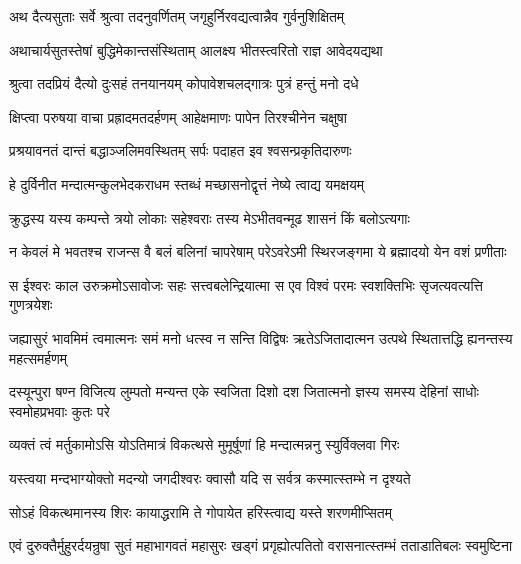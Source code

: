 


\twolineshloka
{अथ दैत्यसुताः सर्वे श्रुत्वा तदनुवर्णितम्}
{जगृहुर्निरवद्यत्वान्नैव गुर्वनुशिक्षितम्} %

\twolineshloka
{अथाचार्यसुतस्तेषां बुद्धिमेकान्तसंस्थिताम्}
{आलक्ष्य भीतस्त्वरितो राज्ञ आवेदयद्यथा} %

\twolineshloka
{श्रुत्वा तदप्रियं दैत्यो दुःसहं तनयानयम्}
{कोपावेशचलद्गात्रः पुत्रं हन्तुं मनो दधे} %

\twolineshloka
{क्षिप्त्वा परुषया वाचा प्रह्रादमतदर्हणम्}
{आहेक्षमाणः पापेन तिरश्चीनेन चक्षुषा} %

\twolineshloka
{प्रश्रयावनतं दान्तं बद्धाञ्जलिमवस्थितम्}
{सर्पः पदाहत इव श्वसन्प्रकृतिदारुणः} %



\twolineshloka
{हे दुर्विनीत मन्दात्मन्कुलभेदकराधम}
{स्तब्धं मच्छासनोद्वृत्तं नेष्ये त्वाद्य यमक्षयम्} %

\twolineshloka
{क्रुद्धस्य यस्य कम्पन्ते त्रयो लोकाः सहेश्वराः}
{तस्य मेऽभीतवन्मूढ शासनं किं बलोऽत्यगाः} %



\twolineshloka
{न केवलं मे भवतश्च राजन्स वै बलं बलिनां चापरेषाम्}
{परेऽवरेऽमी स्थिरजङ्गमा ये ब्रह्मादयो येन वशं प्रणीताः} %

\twolineshloka
{स ईश्वरः काल उरुक्रमोऽसावोजः सहः सत्त्वबलेन्द्रियात्मा}
{स एव विश्वं परमः स्वशक्तिभिः सृजत्यवत्यत्ति गुणत्रयेशः} %

\twolineshloka
{जह्यासुरं भावमिमं त्वमात्मनः समं मनो धत्स्व न सन्ति विद्विषः}
{ऋतेऽजितादात्मन उत्पथे स्थितात्तद्धि ह्यनन्तस्य महत्समर्हणम्} %

\twolineshloka
{दस्यून्पुरा षण्न विजित्य लुम्पतो मन्यन्त एके स्वजिता दिशो दश}
{जितात्मनो ज्ञस्य समस्य देहिनां साधोः स्वमोहप्रभवाः कुतः परे} %



\twolineshloka
{व्यक्तं त्वं मर्तुकामोऽसि योऽतिमात्रं विकत्थसे}
{मुमूर्षूणां हि मन्दात्मन्ननु स्युर्विक्लवा गिरः} %

\twolineshloka
{यस्त्वया मन्दभाग्योक्तो मदन्यो जगदीश्वरः}
{क्वासौ यदि स सर्वत्र कस्मात्स्तम्भे न दृश्यते} %

\twolineshloka
{सोऽहं विकत्थमानस्य शिरः कायाद्धरामि ते}
{गोपायेत हरिस्त्वाद्य यस्ते शरणमीप्सितम्} %

\twolineshloka
{एवं दुरुक्तैर्मुहुरर्दयन्रुषा सुतं महाभागवतं महासुरः}
{खड्गं प्रगृह्योत्पतितो वरासनात्स्तम्भं तताडातिबलः स्वमुष्टिना} %

